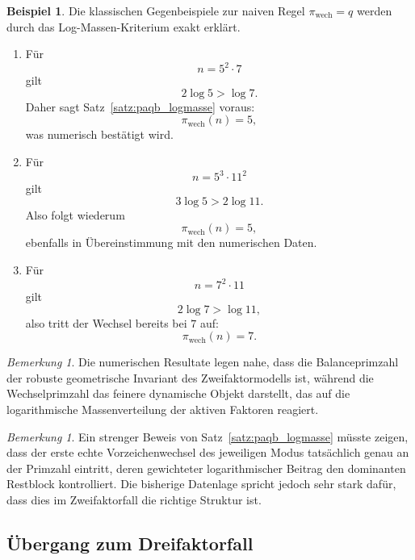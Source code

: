 \documentclass[11pt,a4paper]{article}
\theoremstyle{definition}
\newtheorem{beispiel}[satz]{Beispiel}
\theoremstyle{remark}
\newtheorem{bemerkung}[satz]{Bemerkung}
\begin{document}
	\begin{beispiel}
		Die klassischen Gegenbeispiele zur naiven Regel \(\pi_{\mathrm{wech}}=q\) werden durch das
		Log-Massen-Kriterium exakt erklärt.
		
		\begin{enumerate}
			\item Für
			\[
			n=5^2\cdot 7
			\]
			gilt
			\[
			2\log 5 > \log 7.
			\]
			Daher sagt Satz~\ref{satz:paqb_logmasse} voraus:
			\[
			\pi_{\mathrm{wech}}(n)=5,
			\]
			was numerisch bestätigt wird.
			
			\item Für
			\[
			n=5^3\cdot 11^2
			\]
			gilt
			\[
			3\log 5 > 2\log 11.
			\]
			Also folgt wiederum
			\[
			\pi_{\mathrm{wech}}(n)=5,
			\]
			ebenfalls in Übereinstimmung mit den numerischen Daten.
			
			\item Für
			\[
			n=7^2\cdot 11
			\]
			gilt
			\[
			2\log 7 > \log 11,
			\]
			also tritt der Wechsel bereits bei \(7\) auf:
			\[
			\pi_{\mathrm{wech}}(n)=7.
			\]
		\end{enumerate}
	\end{beispiel}
	
	\begin{bemerkung}
		Die numerischen Resultate legen nahe, dass die Balanceprimzahl der robuste geometrische
		Invariant des Zweifaktormodells ist, während die Wechselprimzahl das feinere dynamische
		Objekt darstellt, das auf die logarithmische Massenverteilung der aktiven Faktoren
		reagiert.
	\end{bemerkung}
	
	\begin{bemerkung}
		Ein strenger Beweis von Satz~\ref{satz:paqb_logmasse} müsste zeigen, dass der erste echte
		Vorzeichenwechsel des jeweiligen Modus tatsächlich genau an der Primzahl eintritt, deren
		gewichteter logarithmischer Beitrag den dominanten Restblock kontrolliert. Die bisherige
		Datenlage spricht jedoch sehr stark dafür, dass dies im Zweifaktorfall die richtige
		Struktur ist.
	\end{bemerkung}
	
	\subsection{Übergang zum Dreifaktorfall}
	
\end{document}
